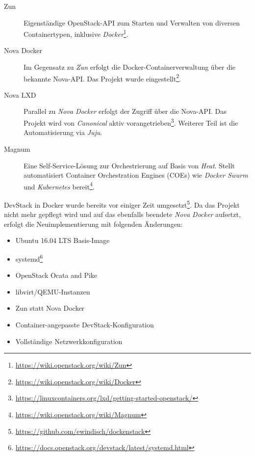 \begin{description}
	
	\item[Zun] Eigenständige OpenStack-API zum Starten und Verwalten von diversen Containertypen, inklusive \emph{Docker}\footnote{\url{https://wiki.openstack.org/wiki/Zun}}.
	
	\item[Nova Docker] Im Gegensatz zu \emph{Zun} erfolgt die Docker-Containerverwaltung über die bekannte Nova-API. Das Projekt wurde eingestellt\footnote{\url{https://wiki.openstack.org/wiki/Docker}}.
	
	\item[Nova LXD] Parallel zu \emph{Nova Docker} erfolgt der Zugriff über die Nova-API. Das Projekt wird von \emph{Canonical} aktiv vorangetrieben\footnote{\url{https://linuxcontainers.org/lxd/getting-started-openstack/}}. Weiterer Teil ist die Automatisierung via \emph{Juju}.
	
	\item[Magnum] Eine Self-Service-Lösung zur Orchestrierung auf Basis von \emph{Heat}. Stellt automatisiert Container Orchestration Engines (COEs) wie \emph{Docker Swarm} und \emph{Kubernetes} bereit\footnote{\url{https://wiki.openstack.org/wiki/Magnum}}.
	
\end{description}

\noindent DevStack in Docker wurde bereits vor einiger Zeit umgesetzt\footnote{\url{https://github.com/ewindisch/dockenstack}}. Da das Projekt nicht mehr gepflegt wird und auf das ebenfalls beendete \emph{Nova Docker} aufsetzt, erfolgt die Neuimplementierung mit folgenden Änderungen:

\begin{itemize}
	
	\item Ubuntu 16.04 LTS Basis-Image
	\item systemd\footnote{\url{https://docs.openstack.org/devstack/latest/systemd.html}}
	\item OpenStack Ocata and Pike
	\item libvirt/QEMU-Instanzen
	\item Zun statt Nova Docker
	\item Container-angepasste DevStack-Konfiguration
	\item Vollständige Netzwerkkonfiguration
	
\end{itemize}

